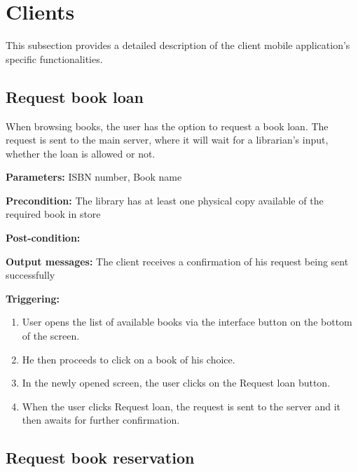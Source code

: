 \section{Clients}
\label{operation:Clients}

This subsection provides a detailed description of the client
mobile application's specific functionalities.

\subsection{Request book loan}

When browsing books, the user has the option to request a book loan. The
request is sent to the main server, where it will wait for a librarian's input, whether
the loan is allowed or not.

\begin{description}

\item \textbf{Parameters: } ISBN number, Book name

\item \textbf{Precondition: } The library has at least one physical copy
available of the required book in store

\item \textbf{Post-condition: } 

\item \textbf{Output messages: } The client receives a confirmation of his
request being sent successfully

\item \textbf{Triggering:}
\begin{enumerate}
\item  User opens the list of available books via the interface button on the
bottom of the screen.

\item  He then proceeds to click on a book of his choice.

\item In the newly opened screen, the user clicks on the Request loan button.

\item When the user clicks Request loan, the request is sent to the server and
it then awaits for further confirmation.
\end{enumerate}
\end{description}

\subsection{Request book reservation}


